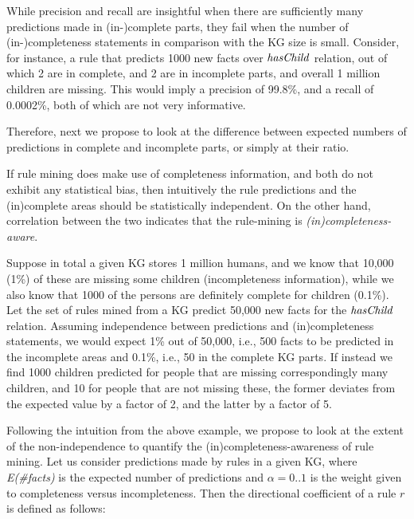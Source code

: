While precision and recall are insightful when there are sufficiently many predictions made in (in-)complete %
parts, they fail when the number of (in-)completeness statements in comparison with the KG size is small. Consider, for instance, a rule that predicts 1000 new facts over $\mathit{hasChild}$ relation, out of which 2 are in complete, and 2 are in incomplete parts, and 
overall 
1 million children are missing. 
This would imply a precision of 99.8\%, and a recall of 0.0002\%, both of which are 
not very informative.

Therefore, next we propose to look at the difference between  
expected numbers of predictions in complete and incomplete parts, or simply at their ratio.


If rule mining does make use of completeness information, and both do not exhibit any statistical bias, then intuitively the rule predictions and the (in)complete areas should be statistically independent. On the other hand, correlation between the two indicates that the rule-mining is \emph{(in)completeness-aware}. 

\begin{example}
Suppose in total a given KG stores 1 million humans, and we know that 10,000 (1\%) of these are missing some children (incompleteness information), while we also know that 1000 of the persons are definitely complete for children (0.1\%). Let the set of rules mined from a KG predict 50,000 new facts for the $\mathit{hasChild}$ relation. Assuming independence between predictions and (in)completeness statements, we would expect 1\% out of 50,000, i.e., 500 facts to be predicted in the incomplete areas and 0.1\%, i.e., 50 in the complete KG parts. If instead we find 1000 children predicted for people that are missing correspondingly many children, and 10 for people that are not missing these, the former deviates from the expected value by a factor of 2, and the latter by a factor of 5.
\end{example}
%
%
Following the intuition from the above example, we propose to look at the extent of the non-independence to quantify the (in)completeness-awareness of rule mining. Let us consider predictions made by rules in a given KG, where \textit{E(\#facts)} is the expected number of predictions and $\alpha=0..1$ is the weight given to completeness versus incompleteness. Then the directional coefficient of a rule $r$ is defined as follows:

